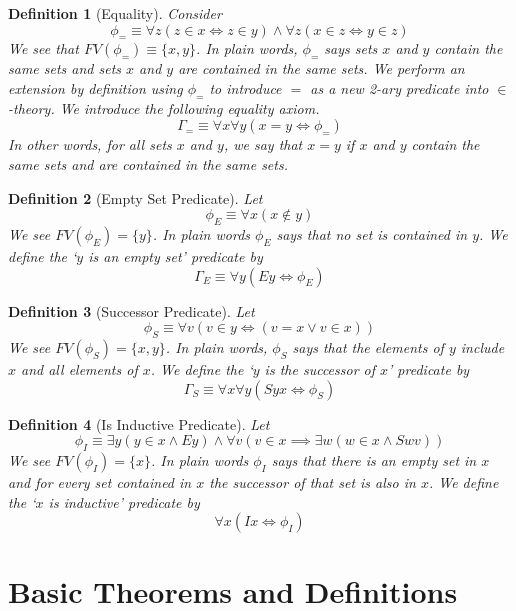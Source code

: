 \documentclass[12pt]{article}
\theoremstyle{break}
\newtheorem{definition}{Definition}[section]
\theoremstyle{break}
\theoremstyle{break}
\theoremstyle{break}
\theoremstyle{break}
\newtheorem{informal definition}[definition]{Informal Definition}
\begin{document}
\begin{definition}[Equality]
Consider
$$
\phi_= \equiv \forall z(z\in x \iff z \in y) \land \forall z (x\in z \iff y\in z)
$$
We see that $FV(\phi_=) \equiv \{x, y\}$.
In plain words, $\phi_=$ says sets $x$ and $y$ contain the same sets and sets $x$ and $y$ are contained in the same sets.
We perform an extension by definition using $\phi_=$ to introduce $=$ as a new 2-ary predicate into $\in$-theory.
We introduce the following equality axiom.
$$
\Gamma_= \equiv \forall x \forall y (x=y \iff \phi_=)
$$
In other words, for all sets $x$ and $y$, we say that $x=y$ if $x$ and $y$ contain the same sets and are contained in the same sets.
\end{definition}

\begin{definition}[Empty Set Predicate]
Let
$$
\phi_E \equiv \forall x (x\not\in y)
$$
We see $FV(\phi_E) = \{y\}$.
In plain words $\phi_E$ says that no set is contained in $y$.
We define the `$y$ is an empty set' predicate by
$$
\Gamma_E \equiv \forall y (Ey \iff \phi_E)
$$
\end{definition}

\begin{definition}[Successor Predicate]
Let
$$
\phi_S \equiv \forall v (v\in y \iff (v = x \lor v\in x))
$$
We see $FV(\phi_S) = \{x, y\}$.
In plain words, $\phi_S$ says that the elements of $y$ include $x$ and all elements of $x$.
We define the `$y$ is the successor of $x$' predicate by
$$
\Gamma_S \equiv \forall x \forall y (Syx \iff \phi_S)
$$
\end{definition}

\begin{definition}[Is Inductive Predicate]
Let
$$
\phi_I \equiv \exists y (y\in x \land Ey) \land \forall v(v\in x \implies \exists w (w\in x \land Swv))
$$
We see $FV(\phi_I) = \{x\}$.
In plain words $\phi_I$ says that there is an empty set in $x$ and for every set contained in $x$ the successor of that set is also in $x$.
We define the `$x$ is inductive' predicate by
$$
\forall x (Ix \iff \phi_I)
$$
\end{definition}

\section{Basic Theorems and Definitions}
\end{document}
